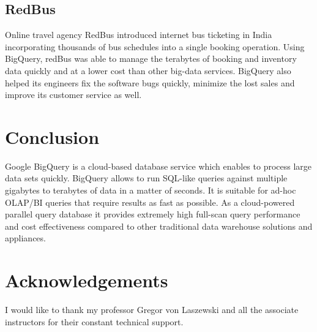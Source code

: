 \documentclass[9pt,twocolumn,twoside]{../../styles/osajnl}
\begin{document}
\subsection{RedBus}
Online travel agency RedBus \cite{www-usecase-redbus} introduced
internet bus ticketing in India incorporating thousands of bus
schedules into a single booking operation. Using BigQuery, redBus was
able to manage the terabytes of booking and inventory data quickly and
at a lower cost than other big-data services. BigQuery also helped its
engineers fix the software bugs quickly, minimize the lost sales and improve its customer service as well.

\section{Conclusion}
Google BigQuery is a cloud-based database service which enables to
process large data sets quickly. BigQuery allows to run SQL-like
queries against multiple gigabytes to terabytes of data in a matter of
seconds. It is suitable for ad-hoc OLAP/BI \cite{www-olap} queries that
require results as fast as possible. As a cloud-powered parallel query
database it provides extremely high full-scan query performance and
cost effectiveness compared to other traditional data warehouse
solutions and appliances.

\section*{Acknowledgements}

I would like to thank my professor Gregor von Laszewski and all the
associate instructors for their constant technical support.



 
\newpage

\appendix
\end{document}
